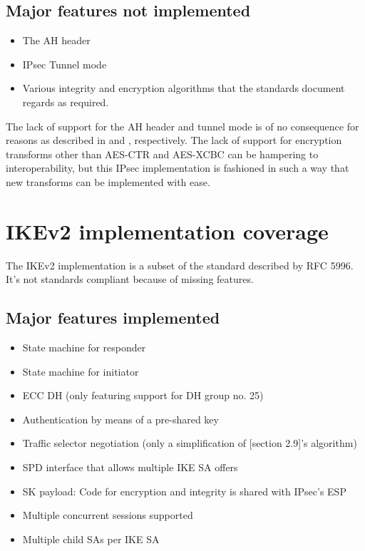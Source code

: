 \documentclass[final,a4paper,twoside,11pt,onecolumn]{report}
\begin{document}
\subsection{Major features not implemented}
\label{sec:ipsec-features-not-imp}
\begin{itemize}
        \item The AH header
        \item IPsec Tunnel mode
        \item Various integrity and encryption algorithms that the standards document regards as required.
\end{itemize}

The lack of support for the AH header and tunnel mode is of no consequence for reasons as described in  and , respectively. The lack of support for encryption transforms other than AES-CTR and AES-XCBC can be hampering to interoperability, but this IPsec implementation is fashioned in such a way that new transforms can be implemented with ease.

\section{IKEv2 implementation coverage}
\label{sec:ike-impl-coverage}
The IKEv2 implementation is a subset of the standard described by RFC 5996. It's not standards compliant because of missing features.

\subsection{Major features implemented}
\begin{itemize}
   \item State machine for responder
   \item State machine for initiator
   \item ECC DH (only featuring support for DH group no. 25)
   \item Authentication by means of a pre-shared key
   \item Traffic selector negotiation (only a simplification of \citep{rfc5996}[section 2.9]'s algorithm)
   \item SPD interface that allows multiple IKE SA offers
   \item SK payload: Code for encryption and integrity is shared with IPsec's ESP
   \item Multiple concurrent sessions supported
   \item Multiple child SAs per IKE SA
\end{itemize}
\end{document}
